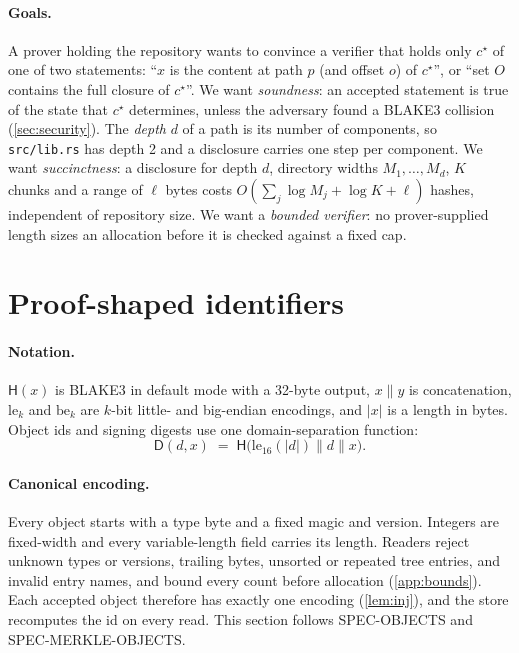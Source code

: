 \documentclass[10pt,letterpaper]{article}
\theoremstyle{remark}
\newcommand{\Hb}{\mathsf{H}}
\newcommand{\D}{\mathsf{D}}
\newcommand{\cc}{\mathbin{\|}}
\begin{document}
\paragraph{Goals.}
A prover holding the repository wants to convince a verifier that holds only
$c^\star$ of one of two statements: ``$x$ is the content at path $p$ (and
offset $o$) of $c^\star$'', or ``set $O$ contains the full closure of
$c^\star$''. We want \emph{soundness}: an accepted statement is true of the
state that $c^\star$ determines, unless the adversary found a BLAKE3 collision
(\cref{sec:security}). The \emph{depth} $d$ of a path is its number of
components, so \texttt{src/lib.rs} has depth 2 and a disclosure carries one
step per component. We want \emph{succinctness}: a disclosure for depth $d$,
directory widths $M_1, \dots, M_d$, $K$ chunks and a range of $\ell$ bytes
costs $O(\sum_j \log M_j + \log K + \ell)$ hashes, independent of repository
size. We want a \emph{bounded verifier}: no prover-supplied length sizes an
allocation before it is checked against a fixed cap.

\section{Proof-shaped identifiers}\label{sec:objects}

\paragraph{Notation.}
$\Hb(x)$ is BLAKE3 in default mode with a 32-byte output, $x \cc y$ is
concatenation, $\mathrm{le}_k$ and $\mathrm{be}_k$ are $k$-bit little- and
big-endian encodings, and $|x|$ is a length in bytes. Object ids and signing
digests use one domain-separation function:
\begin{equation}\label{eq:dd}
  \D(d, x) \;=\; \Hb\bigl(\mathrm{le}_{16}(|d|) \cc d \cc x\bigr).
\end{equation}

\paragraph{Canonical encoding.}
Every object starts with a type byte and a fixed magic and version. Integers
are fixed-width and every variable-length field carries its length. Readers
reject unknown types or versions, trailing bytes, unsorted or repeated tree
entries, and invalid entry names, and bound every count before allocation
(\cref{app:bounds}). Each accepted object therefore has exactly one encoding
(\cref{lem:inj}), and the store recomputes the id on every read. This section
follows SPEC-OBJECTS and SPEC-MERKLE-OBJECTS.
\end{document}

